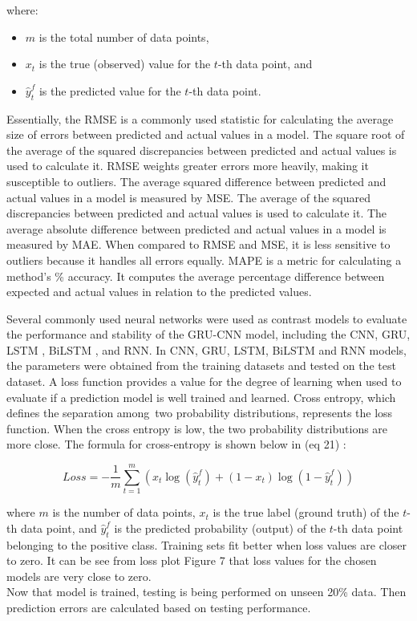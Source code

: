 \documentclass[a4paper, fleqn]{cas-sc}
\begin{document}
where:
\begin{itemize}
  \item $m$ is the total number of data points, 
  \item $x_t$ is the true (observed) value for the $t$-th data point,  and
  \item $\hat{y}_{t}^f$ is the predicted value for the $t$-th data point.
\end{itemize}


Essentially, the RMSE is a commonly used statistic for calculating the average size of errors between predicted and actual values in a model. The square root of the average of the squared discrepancies between predicted and actual values is used to calculate it. RMSE weights greater errors more heavily,  making it susceptible to outliers. The average squared difference between predicted and actual values in a model is measured by MSE. The average of the squared discrepancies between predicted and actual values is used to calculate it. The average absolute difference between predicted and actual values in a model is measured by MAE. When compared to RMSE and MSE,  it is less sensitive to outliers because it handles all errors equally. MAPE is a metric for calculating a method's \% accuracy. It computes the average percentage difference between expected and actual values in relation to the predicted values. 








Several commonly used neural networks were used as contrast models to evaluate the performance and stability of the GRU-CNN model,  including the CNN,  GRU,  LSTM ,  BiLSTM ,  and RNN. In CNN,  GRU,  LSTM,  BiLSTM and RNN models,  the parameters were obtained from the training datasets and tested on the test dataset. A loss function provides a value for the degree of learning when used to evaluate if a prediction model is well trained and learned. Cross entropy,  which defines the separation among two probability distributions,  represents the loss function.
When the cross entropy is low,  the two probability distributions are more close. The formula for cross-entropy is shown below in (eq 21) :

\begin{equation}
  {Loss} =- \frac{1}{m} \sum_{t=1}^{m} \left( x_t \log(\hat{y}_{t}^f) + (1 - x_t) \log(1 - \hat{y}_{t}^f) \right)
\end{equation}

where $m$ is the number of data points,  $x_t$ is the true label (ground truth) of the $t$-th data point,  and $\hat{y}_{t}^f$ is the predicted probability (output) of the $t$-th data point belonging to the positive class.
Training sets fit better when loss values are closer to zero.
It can be see from loss plot Figure 7 that loss values for the chosen models are very close to zero. \\ Now that model is trained,  testing is being performed on unseen 20\% data. Then prediction errors are calculated based on testing performance.
\end{document}

